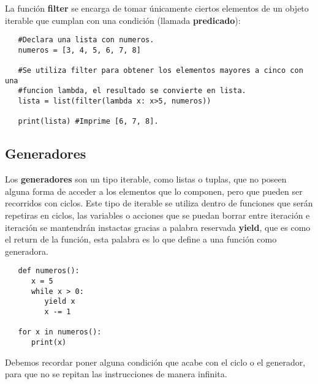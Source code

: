 La función \textbf{filter} se encarga de tomar únicamente ciertos elementos de un objeto iterable que cumplan con una condición (llamada \textbf{predicado}):
\begin{lstlisting}
   #Declara una lista con numeros.
   numeros = [3, 4, 5, 6, 7, 8]
   
   #Se utiliza filter para obtener los elementos mayores a cinco con una
   #funcion lambda, el resultado se convierte en lista.
   lista = list(filter(lambda x: x>5, numeros))
   
   print(lista) #Imprime [6, 7, 8].
\end{lstlisting}


\subsection{Generadores}
\hspace{0.55cm}Los \textbf{generadores} son un tipo iterable, como listas o tuplas, que no poseen alguna forma de acceder a los elementos que lo componen, pero que pueden ser recorridos con ciclos. Este tipo de iterable se utiliza dentro de funciones que serán repetiras en ciclos, las variables o acciones que se puedan borrar entre iteración e iteración se mantendrán instactas gracias a palabra reservada \textbf{yield}, que es como el return de la función, esta palabra es lo que define a una función como generadora.
\begin{lstlisting}
   def numeros():
      x = 5
      while x > 0:
         yield x
         x -= 1
         
   for x in numeros():
      print(x)
\end{lstlisting}

Debemos recordar poner alguna condición que acabe con el ciclo o el generador, para que no se repitan las instrucciones de manera infinita.


